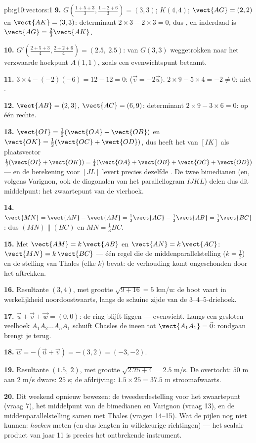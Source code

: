 \begin{solution}{pb:g10:vectors:1}
\textbf{9.} $G\left(\frac{1+5+3}{3}, \frac{1+2+6}{3}\right) = (3, 3)$;
$K(4, 4)$; $\vect{AG} = (2, 2)$ en $\vect{AK} = (3, 3)$: determinant
$2 \times 3 - 2 \times 3 = 0$, dus , en inderdaad is
$\vect{AG} = \frac23\vect{AK}$.

\textbf{10.} $G'\left(\frac{2 + 5 + 3}{4}, \frac{2 + 2 + 6}{4}\right) =
(2.5,\ 2.5)$: van $G(3,3)$ weggetrokken naar het verzwaarde hoekpunt
$A(1,1)$, zoals een evenwichtspunt betaamt.

\textbf{11.} $3 \times 4 - (-2)(-6) = 12 - 12 = 0$: 
($\vec v = -2\vec u$). $2 \times 9 - 5 \times 4 = -2 \neq 0$: niet
.

\textbf{12.} $\vect{AB} = (2, 3)$, $\vect{AC} = (6, 9)$: determinant
$2 \times 9 - 3 \times 6 = 0$: op één rechte.

\textbf{13.} $\vect{OI} = \frac12(\vect{OA} + \vect{OB})$ en
$\vect{OK} = \frac12(\vect{OC} + \vect{OD})$, dus heeft het  van
$[IK]$ als plaatsvector
$\frac12(\vect{OI} + \vect{OK}) = \frac14(\vect{OA} + \vect{OB} +
\vect{OC} + \vect{OD})$ --- en de berekening voor $[JL]$ levert precies
dezelfde . De twee bimedianen (en, volgens Varignon, ook de diagonalen
van het parallellogram $IJKL$) delen dus dit middelpunt: het zwaartepunt van
de vierhoek.

\textbf{14.} $\vect{MN} = \vect{AN} - \vect{AM} = \frac13\vect{AC} -
\frac13\vect{AB} = \frac13\vect{BC}$: dus $(MN) \parallel (BC)$ en
$MN = \frac13 BC$.

\textbf{15.} Met $\vect{AM} = k\,\vect{AB}$ en $\vect{AN} = k\,\vect{AC}$:
$\vect{MN} = k\,\vect{BC}$ --- één regel die de middenparallelstelling
($k = \frac12$) en de stelling van Thales (elke $k$) bevat: de verhouding
komt ongeschonden door het aftrekken.

\textbf{16.} Resultante $(3, 4)$, met grootte $\sqrt{9 + 16} = 5$ km/u: de
boot vaart in werkelijkheid noordoostwaarts, langs de schuine zijde van de
$3$--$4$--$5$-driehoek.

\textbf{17.} $\vec u + \vec v + \vec w = (0, 0)$: de ring blijft liggen ---
evenwicht. Langs een gesloten veelhoek $A_1 A_2 \dots A_n A_1$ schuift
Chasles de  ineen tot $\vect{A_1 A_1} = \vec 0$: rondgaan brengt je terug.

\textbf{18.} $\vec w = -(\vec u + \vec v) = -(3, 2) = (-3, -2)$.

\textbf{19.} Resultante $(1.5,\ 2)$, met grootte $\sqrt{2.25 + 4} = 2.5$
m/s. De overtocht: $50$ m aan $2$ m/s dwars: $25$ s; de afdrijving:
$1.5 \times 25 = 37.5$ m stroomafwaarts.

\textbf{20.} Dit weekend opnieuw bewezen: de tweederdestelling voor het
zwaartepunt (vraag 7), het middelpunt van de bimedianen en Varignon (vraag
13), en de middenparallelstelling samen met Thales (vragen 14--15). Wat de
pijlen nog niet kunnen: \emph{hoeken} meten (en dus lengten in willekeurige
richtingen) --- het scalair product van jaar 11 is precies het ontbrekende
instrument.
\end{solution}
